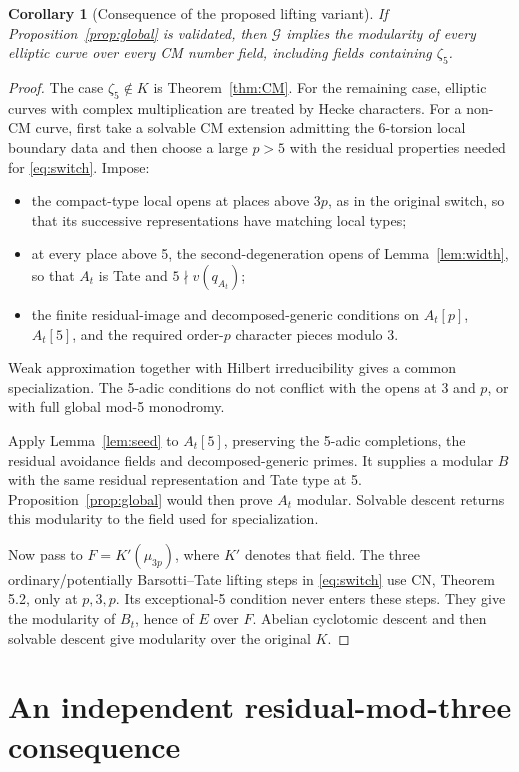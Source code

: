 \documentclass[11pt,a4paper]{article}
\newtheorem{corollary}[theorem]{Corollary}
\theoremstyle{definition}\newtheorem{definition}[theorem]{Definition}
\theoremstyle{remark}\newtheorem*{remark}{Remark}
\newcommand{\Ginput}{\mathcal G}
\begin{document}
\begin{corollary}[Consequence of the proposed lifting variant]
\label{cor:allcm}
If Proposition~\ref{prop:global} is validated, then
$\Ginput$ implies the modularity of every elliptic curve over
every CM number field, including fields containing $\zeta_5$.
\end{corollary}
\begin{proof}
The case $\zeta_5\notin K$ is Theorem~\ref{thm:CM}. For the remaining
case, elliptic curves with complex multiplication are treated by Hecke
characters. For a non-CM curve, first take a solvable CM extension admitting
the 6-torsion local boundary data and then choose a large $p>5$ with the
residual properties needed for \eqref{eq:switch}. Impose:
\begin{itemize}
\item the compact-type local opens at places above $3p$, as in the original
switch, so that its successive representations have matching local types;
\item at every place above 5, the second-degeneration opens of
Lemma~\ref{lem:width}, so that $A_t$ is Tate and
$5\nmid v(q_{A_t})$;
\item the finite residual-image and decomposed-generic conditions on
$A_t[p]$, $A_t[5]$, and the required order-$p$ character pieces modulo 3.
\end{itemize}
Weak approximation together with Hilbert irreducibility gives a common
specialization. The 5-adic conditions do not conflict with the opens at
3 and $p$, or with full global mod-5 monodromy.

Apply Lemma~\ref{lem:seed} to $A_t[5]$, preserving the 5-adic completions,
the residual avoidance fields and decomposed-generic primes. It supplies a
modular $B$ with the same residual representation and Tate type at 5.
Proposition~\ref{prop:global} would then prove $A_t$ modular. Solvable
descent returns this modularity to the field used for specialization.

Now pass to $F=K'(\mu_{3p})$, where $K'$ denotes that field. The three
ordinary/potentially Barsotti--Tate lifting steps in \eqref{eq:switch}
use CN, Theorem 5.2, only at $p,3,p$. Its exceptional-5 condition never
enters these steps. They give the modularity of $B_t$, hence of $E$ over
$F$. Abelian cyclotomic descent and then solvable descent give modularity
over the original $K$.
\end{proof}

\section{An independent residual-mod-three consequence}
\end{document}
